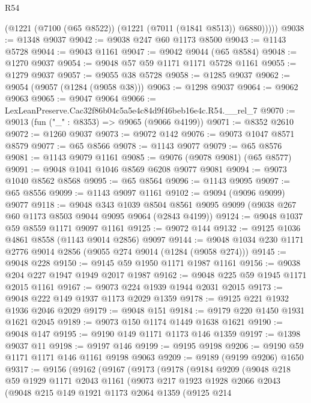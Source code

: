 \begin{lexlean}{R54}
\begin{coremodule}
          (@1221 (@7100 (@65 @8522)) (@1221 (@7011 (@1841 @8513)) @6880)))))
@9038 := @1348 @9037
@9042 := @9038 @247 @60 @1173 @8500
@9043 := @1143 @5728
@9044 := @9043 @1161
@9047 := @9042 @9044 (@65 @8584)
@9048 := @1270 @9037
@9054 := @9048 @57 @59 @1171 @1171 @5728 @1161
@9055 := @1279 @9037
@9057 := @9055 @38 @5728
@9058 := @1285 @9037
@9062 := @9054 (@9057 (@1284 (@9058 @38)))
@9063 := @1298 @9037
@9064 := @9062 @9063
@9065 := @9047 @9064
@9066 := LexLeanPreserve.Cac32f86b04c5a5e4c84d9f46beb16e4c.R54.__rel_7
@9070 := @9013 (fun ("_" : @8353) => @9065 (@9066 @4199))
@9071 := @8352 @2610
@9072 := @1260 @9037
@9073 := @9072 @142
@9076 := @9073 @1047 @8571 @8579
@9077 := @65 @8566
@9078 := @1143 @9077
@9079 := @65 @8576
@9081 := @1143 @9079 @1161
@9085 := @9076 (@9078 @9081) (@65 @8577)
@9091 := @9048 @1041 @1046 @8569 @6208 @9077 @9081
@9094 := @9073 @1040 @8562 @8568
@9095 := @65 @8564
@9096 := @1143 @9095
@9097 := @65 @8556
@9099 := @1143 @9097 @1161
@9102 := @9094 (@9096 @9099) @9077
@9118 := @9048
    @343
    @1039
    @8504
    @8561
    @9095
    @9099
    (@9038 @267 @60 @1173 @8503 @9044 @9095 @9064 (@2843 @4199))
@9124 := @9048 @1037 @59 @8559 @1171 @9097 @1161
@9125 := @9072 @144
@9132 := @9125 @1036 @4861 @8558 (@1143 @9014 @2856) @9097
@9144 := @9048 @1034 @230 @1171 @2776 @9014 @2856 (@9055 @274 @9014 (@1284 (@9058 @274)))
@9145 := @9048 @228
@9150 := @9145 @59 @1950 @1171 @1987 @1161
@9156 := @9038 @204 @227 @1947 @1949 @2017 @1987
@9162 := @9048 @225 @59 @1945 @1171 @2015 @1161
@9167 := @9073 @224 @1939 @1944 @2031 @2015
@9173 := @9048 @222 @149 @1937 @1173 @2029 @1359
@9178 := @9125 @221 @1932 @1936 @2046 @2029
@9179 := @9048 @151
@9184 := @9179 @220 @1450 @1931 @1621 @2045
@9189 := @9073 @150 @1174 @1449 @1638 @1621
@9190 := @9048 @147
@9195 := @9190 @149 @1171 @1173 @146 @1359
@9197 := @1398 @9037 @11
@9198 := @9197 @146
@9199 := @9195 @9198
@9206 := @9190 @59 @1171 @1171 @146 @1161 @9198 @9063
@9209 := @9189 (@9199 @9206) @1650
@9317 := @9156
    (@9162
      (@9167
        (@9173
          (@9178
            (@9184
              @9209
              (@9048
                @218
                @59
                @1929
                @1171
                @2043
                @1161
                (@9073
                  @217
                  @1923
                  @1928
                  @2066
                  @2043
                  (@9048
                    @215
                    @149
                    @1921
                    @1173
                    @2064
                    @1359
                    (@9125
                      @214

\end{coremodule}
\end{lexlean}
